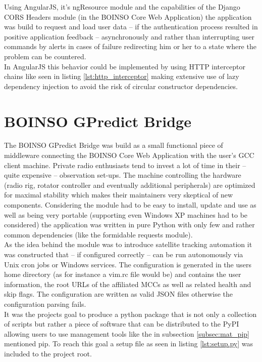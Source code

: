 \documentclass[BachelorPaper]{subfiles}
\begin{document}
Using AngularJS, it's ngResource module and the capabilities of the Django \ac{CORS} Headers module (in the BOINSO Core Web Application) the application was build to request and load user data -- if the authentication process resulted in positive application feedback -- asynchronously and rather than interrupting user commands by alerts in cases of failure redirecting him or her to a state where the problem can be countered.\\

In AngularJS this behavior could be implemented by using \ac{HTTP} interceptor chains like seen in listing \ref{lst:http_interceptor} making extensive use of lazy dependency injection to avoid the risk of circular constructor dependencies.\\



\section{BOINSO GPredict Bridge}
\label{sec:methods_boinso_bridge}

The BOINSO GPredict Bridge was build as a small functional piece of middleware connecting the BOINSO Core Web Application with the user's \ac{GCC} client machine. Private radio enthusiasts tend to invest a lot of time in their -- quite expensive -- observation set-ups. The machine controlling the hardware (radio rig, rotator controller and eventually additional peripherals) are optimized for maximal stability which makes their maintainers very skeptical of new components. Considering the module had to be easy to install, update and use as well as being very portable (supporting even Windows XP machines had to be considered) the application was written in pure Python with only few and rather common dependencies (like the formidable requests module).\\

As the idea behind the module was to introduce satellite tracking automation it was constructed that -- if configured correctly -- can be run autonomously via Unix cron jobs or Windows services. The configuration is generated in the users home directory (as for instance a vim.rc file would be) and contains the user information, the root \acp{URL} of the affiliated \acp{MCC} as well as related health and skip flags. The configuration are written as valid \ac{JSON} files otherwise the configuration parsing fails.\\

It was the projects goal to produce a python package that is not only a collection of scripts but rather a piece of software that can be distributed to the \ac{PyPI} allowing users to use management tools like the in subsection \ref{subsec:mat_pip} mentioned pip. To reach this goal a setup file as seen in listing \ref{lst:setup.py} was included to the project root.\\


\end{document}
